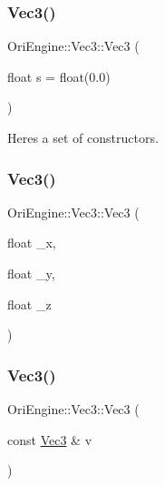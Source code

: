 \subsubsection{\texorpdfstring{Vec3()}{Vec3()}\hspace{0.1cm}{\footnotesize\ttfamily [1/3]}}
{\footnotesize\ttfamily Ori\+Engine\+::\+Vec3\+::\+Vec3 (\begin{DoxyParamCaption}\item[{float}]{s = {\ttfamily float(0.0)} }\end{DoxyParamCaption})\hspace{0.3cm}{\ttfamily [inline]}}



Here\textquotesingle{}s a set of constructors. 

\hypertarget{struct_ori_engine_1_1_vec3_af2c77725c493c84a934fb358b311d87e}{}\label{struct_ori_engine_1_1_vec3_af2c77725c493c84a934fb358b311d87e} 
\subsubsection{\texorpdfstring{Vec3()}{Vec3()}\hspace{0.1cm}{\footnotesize\ttfamily [2/3]}}
{\footnotesize\ttfamily Ori\+Engine\+::\+Vec3\+::\+Vec3 (\begin{DoxyParamCaption}\item[{float}]{\+\_\+x,  }\item[{float}]{\+\_\+y,  }\item[{float}]{\+\_\+z }\end{DoxyParamCaption})\hspace{0.3cm}{\ttfamily [inline]}}

\hypertarget{struct_ori_engine_1_1_vec3_adb231ac012b0ca1101b7e340bf2a72b0}{}\label{struct_ori_engine_1_1_vec3_adb231ac012b0ca1101b7e340bf2a72b0} 
\subsubsection{\texorpdfstring{Vec3()}{Vec3()}\hspace{0.1cm}{\footnotesize\ttfamily [3/3]}}
{\footnotesize\ttfamily Ori\+Engine\+::\+Vec3\+::\+Vec3 (\begin{DoxyParamCaption}\item[{const \hyperlink{struct_ori_engine_1_1_vec3}{Vec3} \&}]{v }\end{DoxyParamCaption})\hspace{0.3cm}{\ttfamily [inline]}}



